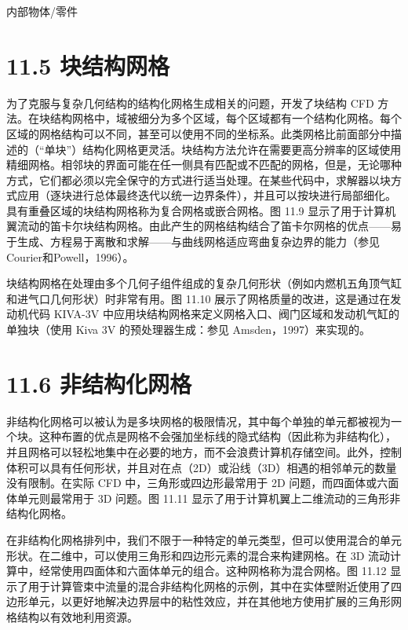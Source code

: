 \documentclass[11pt,a4paper,openany,fontset=none]{ctexbook}
\begin{document}
内部物体/零件

\section*{11.5 块结构网格}

为了克服与复杂几何结构的结构化网格生成相关的问题，开发了块结构 CFD 方法。在块结构网格中，域被细分为多个区域，每个区域都有一个结构化网格。每个区域的网格结构可以不同，甚至可以使用不同的坐标系。此类网格比前面部分中描述的（“单块”）结构化网格更灵活。块结构方法允许在需要更高分辨率的区域使用精细网格。相邻块的界面可能在任一侧具有匹配或不匹配的网格，但是，无论哪种方式，它们都必须以完全保守的方式进行适当处理。在某些代码中，求解器以块方式应用（逐块进行总体最终迭代以统一边界条件），并且可以按块进行局部细化。具有重叠区域的块结构网格称为复合网格或嵌合网格。图 11.9 显示了用于计算机翼流动的笛卡尔块结构网格。由此产生的网格结构结合了笛卡尔网格的优点——易于生成、方程易于离散和求解——与曲线网格适应弯曲复杂边界的能力（参见Courier和Powell，1996）。

块结构网格在处理由多个几何子组件组成的复杂几何形状（例如内燃机五角顶气缸和进气口几何形状）时非常有用。图 11.10 展示了网格质量的改进，这是通过在发动机代码 KIVA-3V 中应用块结构网格来定义网格入口、阀门区域和发动机气缸的单独块（使用 Kiva 3V 的预处理器生成：参见 Amsden，1997）来实现的。

\section*{11.6 非结构化网格}

非结构化网格可以被认为是多块网格的极限情况，其中每个单独的单元都被视为一个块。这种布置的优点是网格不会强加坐标线的隐式结构（因此称为非结构化），并且网格可以轻松地集中在必要的地方，而不会浪费计算机存储空间。此外，控制体积可以具有任何形状，并且对在点（2D）或沿线（3D）相遇的相邻单元的数量没有限制。在实际 CFD 中，三角形或四边形最常用于 2D 问题，而四面体或六面体单元则最常用于 3D 问题。图 11.11 显示了用于计算机翼上二维流动的三角形非结构化网格。

在非结构化网格排列中，我们不限于一种特定的单元类型，但可以使用混合的单元形状。在二维中，可以使用三角形和四边形元素的混合来构建网格。在 3D 流动计算中，经常使用四面体和六面体单元的组合。这种网格称为混合网格。图 11.12 显示了用于计算管束中流量的混合非结构化网格的示例，其中在实体壁附近使用了四边形单元，以更好地解决边界层中的粘性效应，并在其他地方使用扩展的三角形网格结构以有效地利用资源。
\end{document}
